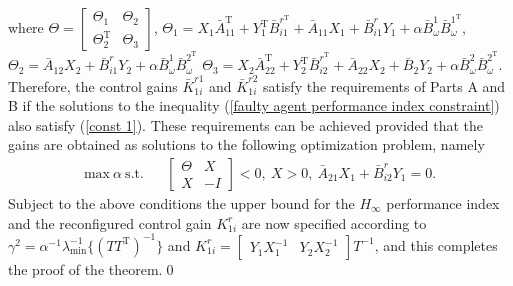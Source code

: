 \documentclass[12pt,draftcls,onecolumn]{IEEEtran}
\begin{document}
where 
$\Theta=\begin{bmatrix}\Theta_1&\Theta_2\\\Theta_2^{\text{T}}&\Theta_3\end{bmatrix}$, $
\Theta_1=X_1\bar A_{11}^{\text{T}}+Y_1^{\text{T}}\bar B_{i1}^{r^\text{T}}+\bar A_{11}X_1+\bar B_{i1}^r Y_1+\alpha \bar B^1_{\omega}\bar B_{\omega}^{1^{\text{T}}}$, $\Theta_2=\bar A_{12}X_2+\bar B_{i1}^rY_2+\alpha \bar B^1_{\omega}\bar B_{\omega}^{2^{\text{T}}}$
 $\Theta_3=X_2\bar A_{22}^{\text{T}}+Y_2^{\text{T}}\bar B_{i2}^{r^{\text{T}}}+\bar A_{22}X_2+\bar B_{2}Y_2+\alpha\bar B^{2}_{\omega}\bar B_{\omega}^{2^\text{T}}$. Therefore, the control gains $\bar K_{1i}^{r1}$ and $\bar K_{1i}^{r2}$ satisfy the requirements of Parts A and B if the solutions to the inequality  (\ref{faulty agent performance index constraint}) also satisfy (\ref{const 1}). These requirements can be achieved provided that the gains are obtained as solutions to the following optimization problem, namely
\begin{eqnarray*}
\text{max} \ \alpha \ \text{s.t.}&&  \begin{bmatrix}
\Theta&X\\
X&-I
\end{bmatrix}
<0, \ X>0,\ \bar A_{21}X_1+\bar B_{i2}^r Y_1= 0.
\end{eqnarray*}
Subject to the above conditions the upper bound for the $H_{\infty}$ performance index  and the reconfigured control gain $K_{1i}^{r}$ are now specified according to $\gamma^2=\alpha^{-1}\lambda_{\text{min}}^{-1}\{(TT^{\text{T}})^{-1}\}$ and $K_{1i}^{r}=\begin{bmatrix}
Y_1X_1^{-1}&Y_2X_2^{-1}
\end{bmatrix}T^{-1}$, and this completes the proof of the theorem.\qed
\end{document}
